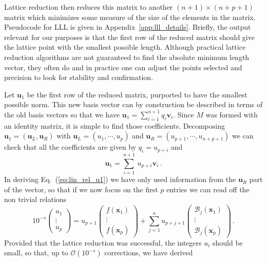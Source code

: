 \documentclass[a4paper,11pt]{article}
\begin{document}
Lattice reduction then reduces this matrix to another $(n\!+\!1)\times(n\!+\!p\!+\!1)$ matrix which minimizes some measure of the size of the elements in the matrix. Pseudocode for LLL is given in Appendix~\ref{app:lll_details}. Briefly, the output relevant for our purposes is that the first row of the reduced matrix should give the lattice point with the smallest possible length. Although practical lattice reduction algorithms are not guaranteed to find the absolute minimum length vector, they often do and in practice one can adjust the points selected and precision to look for stability and confirmation. 


Let $\mathbf{u}_1$ be the first row of the reduced matrix, purported to have the smallest possible norm. This new basis vector can by construction be described in terms of the old basis vectors so that we have $\mathbf{u}_1= \sum_{i=1}^{n+1} q_i \mathbf{v}_{i}$. Since $M$ was formed with an identity matrix, it is simple to find those coefficients. Decomposing $\mathbf{u}_1=(\mathbf{u}_L, \mathbf{u}_R)$ with $\mathbf{u}_L = (u_1, \cdots, u_p)$ and $\mathbf{u}_R = (u_{p+1}, \cdots, u_{n+p+1})$ we can check that all the coefficients are given by $q_i = u_{p+i}$ and 
\begin{equation} \label{eq:lin_rel_u1}
    \mathbf{u}_1 = \sum_{i=1}^{n+1} \, u_{p+i} \mathbf{v}_i \,.
\end{equation}
In deriving Eq.~(\ref{eq:lin_rel_u1}) we have only used information from the $\mathbf{u}_R$ part of the vector, so that if we now focus on the first $p$ entries we can read off the non trivial relations 
\begin{equation}
   10^{-s}  \begin{pmatrix}
        u_1 \\
        \vdots\\
        u_p
    \end{pmatrix}=  u_{p+1} \begin{pmatrix}
        f(\mathbf{x}_1) \\
        \vdots\\
        f(\mathbf{x}_p) 
    \end{pmatrix} +   \sum_{j=1}^{n} u_{p+j+1} \begin{pmatrix}
        \mathcal{B}_j(\mathbf{x}_1) \\
        \vdots\\
        \mathcal{B}_j(\mathbf{x}_p)
    \end{pmatrix} \,.
\end{equation}
Provided that the lattice reduction was successful, the integers $u_i$ should be small, so that, up to $\mathcal{O}(10^{-s})$ corrections, we have derived 
\end{document}
